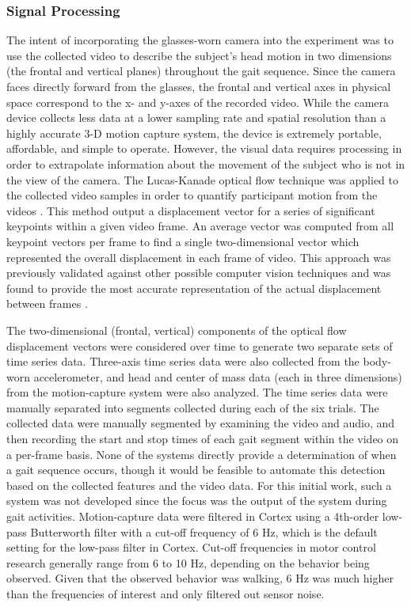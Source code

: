 \documentclass[12pt]{report}
\begin{document}
\subsubsection{Signal Processing}
The intent of incorporating the glasses-worn camera into the experiment was to use the collected video to describe the subject's head motion in two dimensions (the frontal and vertical planes) throughout the gait sequence. Since the camera faces directly forward from the glasses, the frontal and vertical axes in physical space correspond to the x- and y-axes of the recorded video. While the camera device collects less data at a lower sampling rate and spatial resolution than a highly accurate 3-D motion capture system, the device is extremely portable, affordable, and simple to operate. However, the visual data requires processing in order to extrapolate information about the movement of the subject who is not in the view of the camera. The Lucas-Kanade optical flow technique was applied to the collected video samples in order to quantify participant motion from the videos \cite{Lucas1981AnVision}. This method output a displacement vector for a series of significant keypoints within a given video frame. An average vector was computed from all keypoint vectors per frame to find a single two-dimensional vector which represented the overall displacement in each frame of video. This approach was previously validated against other possible computer vision techniques and was found to provide the most accurate representation of the actual displacement between frames \cite{Schneider2017PreliminaryProcessing}.

The two-dimensional (frontal, vertical) components of the optical flow displacement vectors were considered over time to generate two separate sets of time series data. Three-axis time series data were also collected from the body-worn accelerometer, and head and center of mass data (each in three dimensions) from the motion-capture system were also analyzed. The time series data were manually separated into segments collected during each of the six trials. The collected data were manually segmented by examining the video and audio, and then recording the start and stop times of each gait segment within the video on a per-frame basis. None of the systems directly provide a determination of when a gait sequence occurs, though it would be feasible to automate this detection based on the collected features and the video data. For this initial work, such a system was not developed since the focus was the output of the system during gait activities. Motion-capture data were filtered in Cortex using a 4th-order low-pass Butterworth filter with a cut-off frequency of 6 Hz, which is the default setting for the low-pass filter in Cortex. Cut-off frequencies in motor control research generally range from 6 to 10 Hz, depending on the behavior being observed. Given that the observed behavior was walking, 6 Hz was much higher than the frequencies of interest and only filtered out sensor noise.
\end{document}
